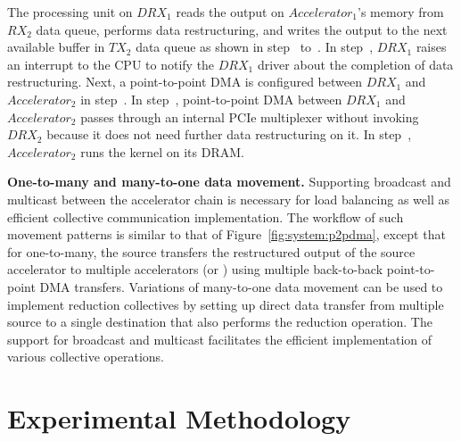 %
The \drx processing unit on $DRX_{1}$ reads the output on $Accelerator_{1}$'s memory from $RX_{2}$ data queue, performs data restructuring, and writes the output to the next available buffer in $TX_{2}$ data queue as shown in step~ to~.
%
In step~, $DRX_{1}$ raises an interrupt to the CPU to notify the $DRX_{1}$ driver about the completion of data restructuring.
%
Next, a point-to-point DMA is configured between $DRX_{1}$ and $Accelerator_{2}$ in step~.  
%
In step~, point-to-point DMA between $DRX_{1}$ and $Accelerator_{2}$ passes through an internal PCIe multiplexer
without invoking $DRX_{2}$ because it does not need further data restructuring on it.
%
In step~, $Accelerator_{2}$ runs the kernel on its DRAM. 

\noindent \textbf{One-to-many and many-to-one data movement.} 
Supporting broadcast and multicast between the accelerator chain is necessary for load balancing as well as efficient collective communication implementation. 
%
The workflow of such movement patterns is similar to that of Figure~\ref{fig:system:p2pdma}, except that for one-to-many, the source \drx transfers the restructured output of the source accelerator to multiple accelerators (or \drxs) using multiple back-to-back point-to-point DMA transfers. 
%
Variations of many-to-one data movement can be used to implement reduction collectives by setting up direct data transfer from multiple source \drxs to a single destination \drx that also performs the reduction operation. 
%
The \dmx support for broadcast and multicast facilitates the efficient implementation of various collective operations. 


\section{Experimental Methodology}
\label{sec:method}

